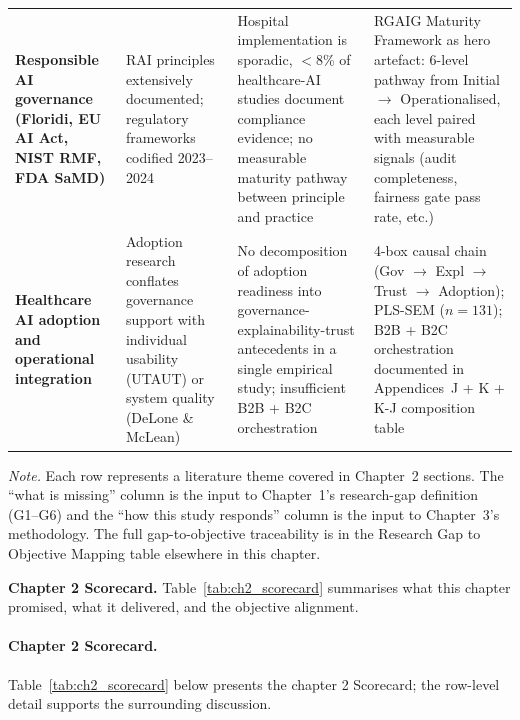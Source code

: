 {\begin{xltabular}{\textwidth}{@{} >{\bfseries}p{2.8cm} L L L @{}}
Responsible AI governance (Floridi, EU AI Act, NIST RMF, FDA SaMD) & RAI principles extensively documented; regulatory frameworks codified 2023--2024 & Hospital implementation is sporadic, $<$8\% of healthcare-AI studies document compliance evidence; no measurable maturity pathway between principle and practice & RGAIG Maturity Framework as hero artefact: 6-level pathway from Initial $\to$ Operationalised, each level paired with measurable signals (audit completeness, fairness gate pass rate, etc.) \\
Healthcare AI adoption and operational integration & Adoption research conflates governance support with individual usability (UTAUT) or system quality (DeLone \& McLean) & No decomposition of adoption readiness into governance-explainability-trust antecedents in a single empirical study; insufficient B2B + B2C orchestration & 4-box causal chain (Gov $\to$ Expl $\to$ Trust $\to$ Adoption); PLS-SEM ($n=131$); B2B + B2C orchestration documented in Appendices~J + K + K-J composition table \\
\end{xltabular}}
\vspace{0.5em}
\noindent\textit{Note.} Each row represents a literature theme covered in Chapter~2 sections. The ``what is missing'' column is the input to Chapter~1's research-gap definition (G1--G6) and the ``how this study responds'' column is the input to Chapter~3's methodology. The full gap-to-objective traceability is in the Research Gap to Objective Mapping table elsewhere in this chapter.

\noindent\textbf{Chapter 2 Scorecard.} Table~\ref{tab:ch2_scorecard} summarises what this chapter promised, what it delivered, and the objective alignment.

\paragraph{Chapter 2 Scorecard.}


\noindent Table~\ref{tab:ch2_scorecard} below presents the chapter 2 Scorecard; the row-level detail supports the surrounding discussion.


